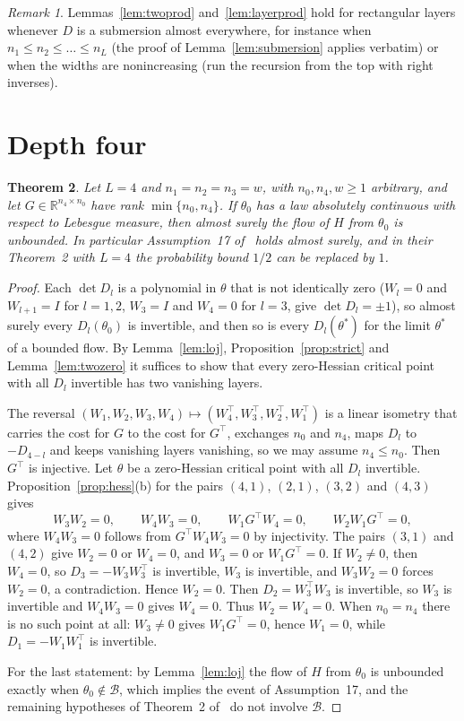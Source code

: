 \documentclass[11pt]{amsart}
\newtheorem{theorem}{Theorem}[section]
\theoremstyle{definition}
\theoremstyle{remark}
\newtheorem{remark}[theorem]{Remark}
\numberwithin{equation}{section}
\newcommand{\RR}{\mathbb{R}}
\begin{document}
\begin{remark}
Lemmas~\ref{lem:twoprod} and~\ref{lem:layerprod} hold for rectangular layers whenever $D$ is a submersion almost everywhere, for instance when $n_1\le n_2\le\dots\le n_L$ (the proof of Lemma~\ref{lem:submersion} applies verbatim) or when the widths are nonincreasing (run the recursion from the top with right inverses).
\end{remark}

\section{Depth four}\label{sec:four}
\begin{theorem}\label{thm:four}
Let $L=4$ and $n_1=n_2=n_3=w$, with $n_0,n_4,w\ge1$ arbitrary, and let $G\in\RR^{n_4\times n_0}$ have rank $\min\{n_0,n_4\}$. If $\theta_0$ has a law absolutely continuous with respect to Lebesgue measure, then almost surely the flow of $H$ from $\theta_0$ is unbounded. In particular Assumption~17 of~\cite{JGSHG} holds almost surely, and in their Theorem~2 with $L=4$ the probability bound $1/2$ can be replaced by $1$.
\end{theorem}
\begin{proof}
Each $\det D_l$ is a polynomial in $\theta$ that is not identically zero ($W_l=0$ and $W_{l+1}=I$ for $l=1,2$, $W_3=I$ and $W_4=0$ for $l=3$, give $\det D_l=\pm1$), so almost surely every $D_l(\theta_0)$ is invertible, and then so is every $D_l(\theta^*)$ for the limit $\theta^*$ of a bounded flow. By Lemma~\ref{lem:loj}, Proposition~\ref{prop:strict} and Lemma~\ref{lem:twozero} it suffices to show that every zero-Hessian critical point with all $D_l$ invertible has two vanishing layers.

The reversal $(W_1,W_2,W_3,W_4)\mapsto(W_4^\top,W_3^\top,W_2^\top,W_1^\top)$ is a linear isometry that carries the cost for $G$ to the cost for $G^\top$, exchanges $n_0$ and $n_4$, maps $D_l$ to $-D_{4-l}$ and keeps vanishing layers vanishing, so we may assume $n_4\le n_0$. Then $G^\top$ is injective. Let $\theta$ be a zero-Hessian critical point with all $D_l$ invertible. Proposition~\ref{prop:hess}(b) for the pairs $(4,1)$, $(2,1)$, $(3,2)$ and $(4,3)$ gives
\[
W_3W_2=0,\qquad W_4W_3=0,\qquad W_1G^\top W_4=0,\qquad W_2W_1G^\top=0,
\]
where $W_4W_3=0$ follows from $G^\top W_4W_3=0$ by injectivity. The pairs $(3,1)$ and $(4,2)$ give $W_2=0$ or $W_4=0$, and $W_3=0$ or $W_1G^\top=0$.
If $W_2\ne0$, then $W_4=0$, so $D_3=-W_3W_3^\top$ is invertible, $W_3$ is invertible, and $W_3W_2=0$ forces $W_2=0$, a contradiction. Hence $W_2=0$. Then $D_2=W_3^\top W_3$ is invertible, so $W_3$ is invertible and $W_4W_3=0$ gives $W_4=0$. Thus $W_2=W_4=0$. When $n_0=n_4$ there is no such point at all: $W_3\ne0$ gives $W_1G^\top=0$, hence $W_1=0$, while $D_1=-W_1W_1^\top$ is invertible.

For the last statement: by Lemma~\ref{lem:loj} the flow of $H$ from $\theta_0$ is unbounded exactly when $\theta_0\notin\mathcal{B}$, which implies the event of Assumption~17, and the remaining hypotheses of Theorem~2 of~\cite{JGSHG} do not involve $\mathcal{B}$.
\end{proof}
\end{document}
